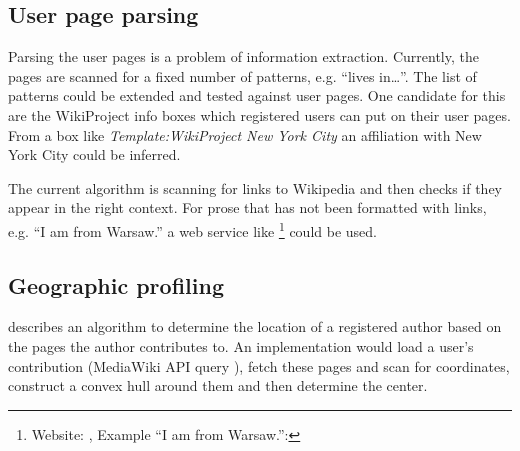 \subsection{User page parsing}

Parsing the user pages is a problem of information extraction.
Currently, the pages are scanned for a fixed number of patterns, e.g. ``lives in\ldots''.
The list of patterns could be extended and tested against user pages.
One candidate for this are the WikiProject info boxes which registered users can put on their user pages.
From a box like \emph{Template:WikiProject New York City} an affiliation with New York City could be inferred.

The current algorithm is scanning for links to Wikipedia and then checks if they appear in the right context.
For prose that has not been formatted with links, e.g. ``I am from Warsaw.'' a web service like \footnote{Website: , Example ``I am from Warsaw.'': } could be used.

\subsection{Geographic profiling}

\textcite{lieberman2009you} describes an algorithm to determine the location of a registered author based on the pages the author contributes to.
An implementation would load a user's contribution (MediaWiki \ac{API} query ), fetch these pages and scan for coordinates, construct a convex hull around them and then determine the center.
